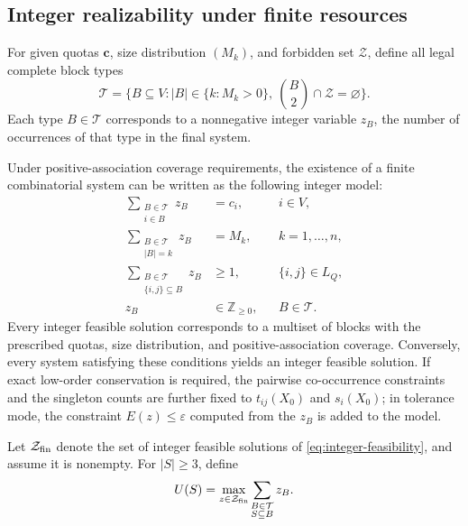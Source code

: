 \documentclass[11pt,a4paper]{article}
\numberwithin{equation}{section}
\theoremstyle{definition}
\numberwithin{algorithm}{section}
\begin{document}
\subsection{Integer realizability under finite resources}\label{subsec:boundary-ilp}

For given quotas $\boldsymbol c$, size distribution $(M_k)$, and forbidden set $\mathcal Z$,
define all legal complete block types
\begin{equation}
\mathcal T=\bigl\{B\subseteq V:
|B|\in\{k:M_k>0\},\ 
\binom B2\cap\mathcal Z=\varnothing\bigr\}.
\label{eq:allowed-types}
\end{equation}
Each type $B\in\mathcal T$ corresponds to a nonnegative integer variable $z_B$, the number of
occurrences of that type in the final system.

Under positive-association coverage requirements, the existence of a finite combinatorial
system can be written as the following integer model:
\begin{equation}
\begin{aligned}
\sum_{\substack{B\in\mathcal T\\i\in B}}z_B &=c_i,
&&i\in V,\\
\sum_{\substack{B\in\mathcal T\\|B|=k}}z_B &=M_k,
&&k=1,\ldots,n,\\
\sum_{\substack{B\in\mathcal T\\\{i,j\}\subseteq B}}z_B&\ge1,
&&\{i,j\}\in L_Q,\\
z_B&\in\mathbb Z_{\ge0},
&&B\in\mathcal T .
\end{aligned}
\label{eq:integer-feasibility}
\end{equation}
Every integer feasible solution corresponds to a multiset of blocks with the prescribed
quotas, size distribution, and positive-association coverage.
Conversely, every system satisfying these conditions yields an integer feasible solution.
If exact low-order conservation is required, the pairwise co-occurrence constraints and the
singleton counts are further fixed to $t_{ij}(X_0)$ and $s_i(X_0)$;
in tolerance mode, the constraint $E(z)\le\varepsilon$ computed from the $z_B$ is added to
the model.

Let $\mathcal Z_{\rm fin}$ denote the set of integer feasible solutions of
\eqref{eq:integer-feasibility}, and assume it is nonempty.
For $|S|\ge3$, define
\begin{equation}
U(S)=
\max_{z\in\mathcal Z_{\rm fin}}
\sum_{\substack{B\in\mathcal T\\S\subseteq B}}z_B .
\label{eq:max-higher-count}
\end{equation}
\end{document}
